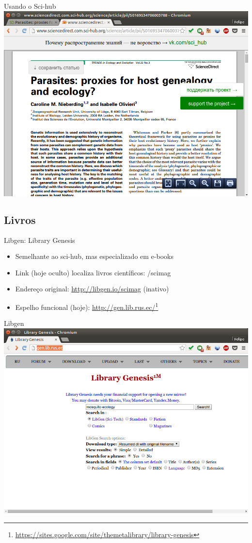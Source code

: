 \documentclass{beamer}
\begin{document}
\begin{frame}{Usando o Sci-hub}
  \includegraphics[height=.85\textheight]{Busca/scihub-busca3}
\end{frame}

\subsection{Livros}

\begin{frame}{Libgen: Library Genesis}
  \begin{itemize}
  \item Semelhante ao sci-hub, mas especializado em e-books
  \item Link (hoje oculto) localiza livros científicos:
    \alert{/scimag}
  \item Endereço original: \url{http://libgen.io/scimag} (inativo)
  \item Espelho funcional (hoje): \url{http://gen.lib.rus.ec/}\footnote{\url{https://sites.google.com/site/themetalibrary/library-genesis}}
  \end{itemize}
\end{frame}

\begin{frame}{Libgen}
  \includegraphics[height=.85\textheight]{Busca/libgen-busca1}
\end{frame}
\end{document}
